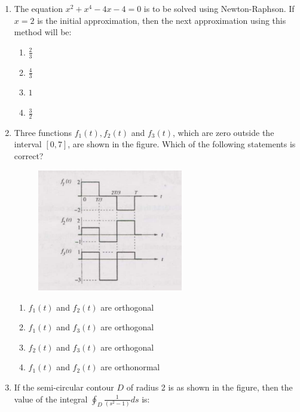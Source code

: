 \documentclass[journal,12pt,onecolumn]{IEEEtran}
\theoremstyle{remark}
\begin{document}
\begin{enumerate}
\item The equation $x^2 + x^4 - 4x - 4 = 0$ is to be solved using Newton-Raphson. If $x = 2$ is the initial approximation, then the next approximation using this method will be:
\hfill{}

\begin{multicols}{4}
\begin{enumerate}
    \item $\frac{2}{3}$
    \item $\frac{4}{3}$
    \item $1$
    \item $\frac{3}{2}$   
\end{enumerate}
\end{multicols}

\item Three functions $f_1(t), f_2(t)$ and $f_3(t)$, which are zero outside the interval $[0,7]$, are shown in the figure. Which of the following statements is correct? 

\begin{figure}[ht!]
    \centering
    \includegraphics[width=0.6\textwidth]{Q26.png}
    \caption{}
    \label{fig:Q26.png}
\end{figure}


\hfill{}
\begin{enumerate}[label=(\Alph*)]
    \item $f_1(t)$ and $f_2(t)$ are orthogonal
    \item $f_1(t)$ and $f_3(t)$ are orthogonal
    \item $f_2(t)$ and $f_3(t)$ are orthogonal
    \item $f_1(t)$ and $f_2(t)$ are orthonormal
\end{enumerate}

\item If the semi-circular contour $D$ of radius 2 is as shown in the figure, then the value of the integral $\displaystyle \oint_D \frac{1}{(s^2 -1)} ds$ is: 


\end{enumerate}
\end{document}
